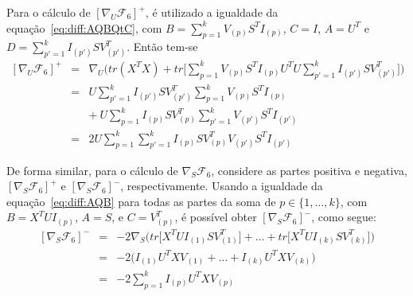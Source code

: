 \documentclass[
    12pt,                %
    oneside,            %
    a4paper,            %
    english,            %
    brazil                %
    ]{abntex2ppgsi}
\begin{document}
Para o cálculo de $[\nabla_U \mathcal{F}_6]^+$, é utilizado a igualdade da equação~\ref{eq:diff:AQBQtC}, com $B = \sum_{p=1}^{k} V_{(p)} S^T I_{(p)}$, $C = I$, $A = U^T$ e $D = \sum_{p'=1}^{k}I_{(p')}SV_{(p')}^T$.
Então tem-se
\[
    \begin{array}{lcl}
        [\nabla_U \mathcal{F}_6]^+ & = & \nabla_U \Big( tr(X^TX) + tr\big[ \sum_{p=1}^{k} V_{(p)} S^T I_{(p)} U^T U \sum_{p'=1}^k I_{(p')} S V_{(p')}^T \big] \Big) \\
                                   & = & U \sum_{p'=1}^k I_{(p')} S V_{(p')}^T \sum_{p=1}^{k} V_{(p)} S^T I_{(p)} \\
                                   &   & + ~ U \sum_{p=1}^k I_{(p)} S V_{(p)}^T \sum_{p'=1}^{k} V_{(p')} S^T I_{(p')} \\
                                   & = & 2 U \sum_{p=1}^k \sum_{p'=1}^{k} I_{(p)} S V_{(p)}^T V_{(p')} S^T I_{(p')}
    \end{array}
\]

De forma similar, para o cálculo de $\nabla_S \mathcal{F}_6$, considere as partes positiva e negativa, $[\nabla_S \mathcal{F}_6]^+$ e $[\nabla_S \mathcal{F}_6]^-$, respectivamente.
Usando a igualdade da equação~\ref{eq:diff:AQB} para todas as partes da soma de $p \in \{1, \dots, k\}$, com $B = X^T U I_{(p)}$, $A = S$, e $C = V_{(p)}^T$, é possível obter $[\nabla_S \mathcal{F}_6]^-$, como segue:
\[
    \begin{array}{lcl}
        [\nabla_S \mathcal{F}_6]^- & = & - 2 \nabla_S \Big( tr\big[ X^T U I_{(1)}SV_{(1)}^T \big] + \dots + tr\big[ X^T U I_{(k)}SV_{(k)}^T \big] \Big) \\
                                   & = & - 2 \Big( I_{(1)} U^T X V_{(1)} + \dots + I_{(k)} U^T X V_{(k)} \Big) \\
                                   & = & - 2 \sum_{p=1}^{k} I_{(p)} U^T X V_{(p)}
    \end{array}
\]
\end{document}
